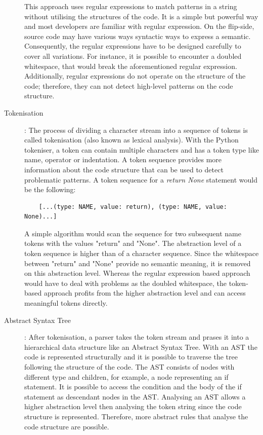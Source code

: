 \begin{description}
    This approach uses regular expressions to match patterns in a string without utilising the structures of the code. It is a simple but powerful way and most developers are familiar with regular expression. On the flip-side, source code may have various ways syntactic ways to express a semantic. Consequently, the regular expressions have to be designed carefully to cover all variations. For instance, it is possible to encounter a doubled whitespace, that would break the aforementioned regular expression. Additionally, regular expressions do not operate on the structure of the code; therefore, they can not detect high-level patterns on the code structure.
    \item[Tokenisation]: The process of dividing a character stream into a sequence of tokens is called tokenisation (also known as lexical analysis). With the Python tokeniser, a token can contain multiple characters and has a token type like name, operator or indentation. A token sequence provides more information about the code structure that can be used to detect problematic patterns. 
    A token sequence for a \textit{return None} statement would be the following: 
    \begin{lstlisting}
    [...(type: NAME, value: return), (type: NAME, value: None)...]
    \end{lstlisting}
    A simple algorithm would scan the sequence for two subsequent name tokens with the values "return" and "None". The abstraction level of a token sequence is higher than of a character sequence. Since the whitespace between "return" and "None" provide no semantic meaning, it is removed on this abstraction level. Whereas the regular expression based approach would have to deal with problems as the doubled whitespace, the token-based approach profits from the higher abstraction level and can access meaningful tokens directly.
    \item[Abstract Syntax Tree]: After tokenisation, a parser takes the token stream and prases it into a hierarchical data structure like an Abstract Syntax Tree. With an AST the code is represented structurally and it is possible to traverse the tree following the structure of the code. The AST consists of nodes with different type and children, for example, a node representing an if statement. It is possible to access the condition and the body of the if statement as descendant nodes in the AST. Analysing an AST allows a higher abstraction level then analysing the token string since the code structure is represented. Therefore, more abstract rules that analyse the code structure are possible.


\end{description}
